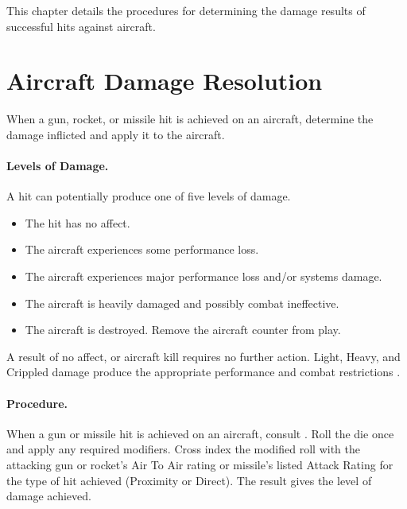 
This chapter details the procedures for determining the damage results of successful hits against aircraft.

\section{Aircraft Damage Resolution}
\label{rule:aircraft-damage-resolution}

When a gun, rocket, or missile hit is achieved on an aircraft, determine the damage inflicted and apply it to the aircraft.


\paragraph{Levels of Damage.} A hit can potentially produce one of five levels of damage.

\begin{itemize}

    \item{} The hit has no affect.

    \item{} The aircraft experiences some performance loss.
    
    \item{} The aircraft experiences major performance loss and/or systems damage.

    \item{} The aircraft is heavily damaged and possibly combat ineffective.
    
    \item{} The aircraft is destroyed. Remove the aircraft counter from play.

\end{itemize}

A result of no affect, or aircraft kill requires no further action. Light, Heavy, and Crippled damage produce the appropriate performance and combat restrictions .

\paragraph{Procedure.} When a gun or missile hit is achieved on an aircraft, consult . Roll the die once and apply any required modifiers. Cross index the modified roll with the attacking gun or rocket's Air To Air rating or missile's listed Attack Rating for the type of hit achieved (Proximity or Direct). The result gives the level of damage achieved.

